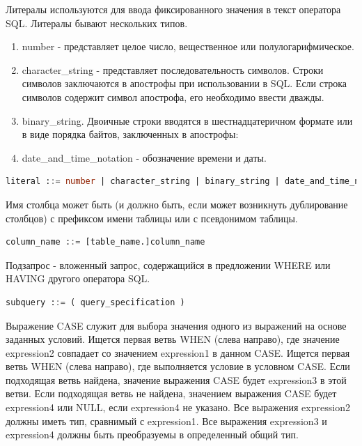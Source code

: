 Литералы используются для ввода фиксированного значения в текст оператора SQL. 
Литералы бывают нескольких типов.

\begin{enumerate}
   \item number - представляет целое число, вещественное или полулогарифмическое.
   \item character\_string - представляет последовательность символов. Строки символов заключаются в апострофы при использовании в SQL. 
   Если строка символов содержит символ апострофа, его необходимо ввести дважды.
   \item binary\_string. Двоичные строки вводятся в шестнадцатеричном формате или в виде порядка байтов, заключенных в апострофы:
   \item date\_and\_time\_notation - обозначение времени и даты.  
\end{enumerate}

\begin{lstlisting}[language=sql, label=some-code, caption=Спецификация SQL запроса]
   literal ::= number | character_string | binary_string | date_and_time_notation
\end{lstlisting}

Имя столбца может быть (и должно быть, если может возникнуть дублирование столбцов) с префиксом имени таблицы или с псевдонимом таблицы.

\begin{lstlisting}[language=sql, label=some-code, caption=Спецификация SQL запроса]
   column_name ::= [table_name.]column_name
\end{lstlisting}

Подзапрос - вложенный запрос, содержащийся в предложении WHERE или HAVING другого оператора SQL.

\begin{lstlisting}[language=sql, label=some-code, caption=Спецификация SQL запроса]
   subquery ::= ( query_specification )
\end{lstlisting}

Выражение CASE служит для выбора значения одного из выражений на основе заданных условий. 
Ищется первая ветвь WHEN (слева направо), где значение expression2 совпадает со значением expression1 в данном CASE. 
Ищется первая ветвь WHEN (слева направо), где выполняется условие в условном CASE. 
Если подходящая ветвь найдена, значение выражения CASE будет expression3 в этой ветви. 
Если подходящая ветвь не найдена, значением выражения CASE будет expression4 или NULL, если expression4 не указано.
Все выражения expression2 должны иметь тип, сравнимый с expression1. 
Все выражения expression3 и expression4 должны быть преобразуемы в определенный общий тип.

